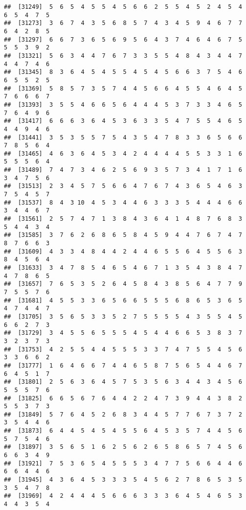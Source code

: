 \documentclass[
]{book}
\begin{document}
\begin{verbatim}
##  [31249]  5  6  5  4  5  5  4  5  6  6  2  5  5  4  5  2  4  5  4  6  5  4  7  5
##  [31273]  3  6  7  4  3  5  6  8  5  7  4  3  4  5  9  4  6  7  7  6  4  2  8  5
##  [31297]  6  6  7  3  6  5  6  9  5  6  4  3  7  4  6  4  6  7  5  5  5  3  9  2
##  [31321]  5  6  3  4  4  7  6  7  3  3  5  5  4  8  4  3  4  4  7  4  4  7  4  6
##  [31345]  8  3  6  4  5  4  5  5  4  5  4  5  6  6  3  7  5  4  6  6  5  5  2  5
##  [31369]  5  8  5  7  3  5  7  4  4  5  6  6  4  5  5  4  6  4  5  7  6  6  6  7
##  [31393]  3  5  5  4  6  6  5  6  4  4  4  5  3  7  3  3  4  6  5  7  6  4  9  6
##  [31417]  6  6  6  3  6  4  5  3  6  3  3  5  4  7  5  5  4  6  5  4  4  9  4  6
##  [31441]  3  5  3  5  5  7  5  4  3  5  4  7  8  3  3  6  5  6  6  7  8  5  6  4
##  [31465]  4  6  3  6  4  5  3  4  2  4  4  4  4  5  5  3  3  1  6  5  5  5  6  4
##  [31489]  7  4  7  3  4  6  2  5  6  9  3  5  7  3  4  1  7  1  6  3  4  7  5  6
##  [31513]  2  3  4  5  7  5  6  6  4  7  6  7  4  3  6  5  4  6  3  7  5  4  5  7
##  [31537]  8  4  3 10  4  5  3  4  4  6  3  3  3  5  4  4  4  6  6  3  4  4  6  7
##  [31561]  2  5  7  4  7  1  3  8  4  3  6  4  1  4  8  7  6  8  3  5  4  4  3  4
##  [31585]  3  7  6  2  6  8  6  5  8  4  5  9  4  4  7  6  7  4  7  8  7  6  6  3
##  [31609]  4  3  3  4  8  4  4  2  4  4  6  5  5  6  4  5  5  6  3  8  4  5  6  4
##  [31633]  3  4  7  8  5  4  6  5  4  6  7  1  3  5  4  3  8  4  7  4  7  8  6  5
##  [31657]  7  6  5  3  5  2  6  4  5  8  4  3  8  5  6  4  7  7  9  7  5  5  7  6
##  [31681]  4  5  5  3  3  6  5  6  6  5  5  5  6  8  6  5  3  6  5  4  7  4  4  7
##  [31705]  3  5  6  5  3  3  5  2  7  5  5  5  5  4  3  5  5  4  5  6  6  2  7  3
##  [31729]  3  4  5  5  6  5  5  5  4  5  4  4  6  6  5  3  8  3  7  3  2  3  7  3
##  [31753]  4  2  5  5  4  4  5  5  5  3  3  7  4  7  5  5  4  5  6  3  3  6  6  2
##  [31777]  1  6  4  6  6  7  4  4  6  5  8  7  5  6  5  4  4  6  7  6  4  5  1  7
##  [31801]  2  5  6  3  6  4  5  7  5  3  5  6  3  4  4  3  4  5  6  5  5  5  7  6
##  [31825]  6  6  5  6  7  6  4  4  2  2  4  7  3  9  4  4  3  8  2  5  5  3  7  3
##  [31849]  5  7  6  4  5  2  6  8  3  4  4  5  7  7  6  7  3  7  2  3  5  4  4  6
##  [31873]  6  4  4  5  4  5  4  5  5  6  4  5  3  5  7  4  4  5  6  5  7  5  4  6
##  [31897]  3  5  6  5  1  6  2  5  6  2  6  5  8  6  5  7  4  5  6  6  6  3  4  9
##  [31921]  7  5  3  6  5  4  5  5  5  3  4  7  7  5  6  6  4  4  6  6  6  4  4  6
##  [31945]  4  3  6  4  5  3  3  3  5  4  5  6  2  7  8  6  5  3  5  3  5  4  7  8
##  [31969]  4  2  4  4  4  5  6  6  6  3  3  3  6  4  5  4  6  5  3  4  4  3  5  4

\end{verbatim}
\end{document}
